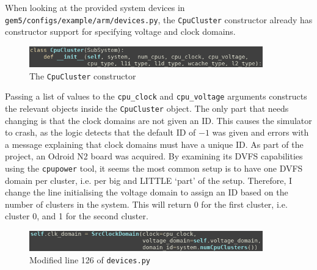     When looking at the provided system devices in 
    \texttt{gem5/configs/example/arm/devices.py}, the \texttt{CpuCluster} 
    constructor already has constructor support for specifying voltage and 
    clock domains.
    \begin{figure}[H]
        \centering
        \includegraphics[width=0.9\textwidth]{screenshots/cpu-cluster-constructor.png}
        \caption{The \texttt{CpuCluster} constructor}
    \end{figure}
    Passing a list of values to the \texttt{cpu\_clock} and 
    \texttt{cpu\_voltage} arguments constructs the relevant objects inside the 
    \texttt{CpuCluster} object. The only part that needs changing is that the 
    clock domains are not given an ID. This causes the simulator to crash, as 
    the logic detects that the default ID of $-1$ was given and errors with a 
    message explaining that clock domains must have a unique ID. As part of the 
    project, an Odroid N2 board was acquired. By examining its DVFS capabilities
    using the \texttt{cpupower} tool, it seems the most common setup is to have
    one DVFS domain per cluster, i.e. per big and LITTLE `part' of the setup.
    Therefore, I change the line initialising the voltage domain to assign an ID
    based on the number of clusters in the system. This will return 0 for the 
    first cluster, i.e. cluster 0, and 1 for the second cluster.
    \begin{figure}[H]
        \centering
        \includegraphics[width=0.9\textwidth]{screenshots/cpu-cluster-clock-domain-assignment.png}
        \caption{Modified line 126 of \texttt{devices.py}}
    \end{figure}
    
